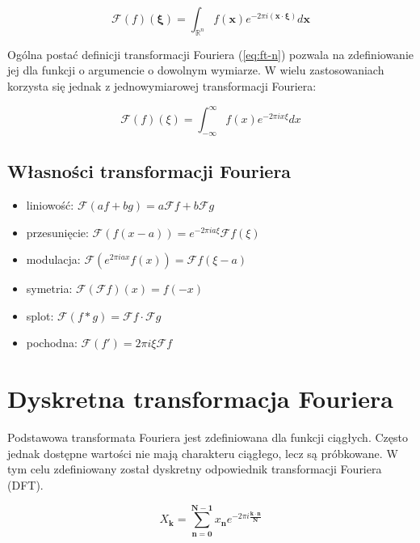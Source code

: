 \documentclass[polish, titlepage, 12pt]{article}
\begin{document}
\begin{equation}\label{eq:ft-n}
    \mathcal{F}(f)(\symbf{\xi}) = \int_{\mathbb{R}^n} f(\symbf{x}) e^{-2\pi i (\symbf{x \cdot \xi})} d\symbf{x}
\end{equation}

Ogólna postać definicji transformacji Fouriera (\ref{eq:ft-n}) pozwala na zdefiniowanie jej
dla funkcji o argumencie o dowolnym wymiarze. W wielu zastosowaniach korzysta się jednak
z jednowymiarowej transformacji Fouriera:

\begin{equation}\label{eq:ft-1}
    \mathcal{F}(f)(\xi) = \int_{-\infty}^{\infty} f(x) e^{-2\pi i x \xi} dx
\end{equation}


\subsection{Własności transformacji Fouriera}
\begin{itemize}
    \item liniowość: \( \mathcal{F}(af + bg) = a\mathcal{F}f + b\mathcal{F}g \)
    \item przesunięcie: \( \mathcal{F}(f(x - a)) = e^{-2\pi i a \xi} \mathcal{F}f(\xi) \)
    \item modulacja: \( \mathcal{F}(e^{2\pi i a x} f(x)) = \mathcal{F}f(\xi - a) \)
    \item symetria: \( \mathcal{F}(\mathcal{F}f)(x) = f(-x) \)
    \item splot: \( \mathcal{F}(f * g) = \mathcal{F}f \cdot \mathcal{F}g \)
    \item pochodna: \( \mathcal{F}(f') = 2\pi i \xi \mathcal{F}f \)
\end{itemize}



\section{Dyskretna transformacja Fouriera}

Podstawowa transformata Fouriera jest zdefiniowana dla funkcji ciągłych.
Często jednak dostępne wartości nie mają charakteru ciągłego, lecz są próbkowane.
W tym celu zdefiniowany został dyskretny odpowiednik transformacji Fouriera (DFT).

\begin{equation}\label{eq:dft-n}
    X_{\symbf{k}} = \sum_{\symbf{n} = \symbf{0}}^{\symbf{N} - \symbf{1}} x_{\symbf{n}} e^{-2\pi i \frac{\symbf{k \cdot n}}{\symbf{N}}}
\end{equation}
\end{document}
